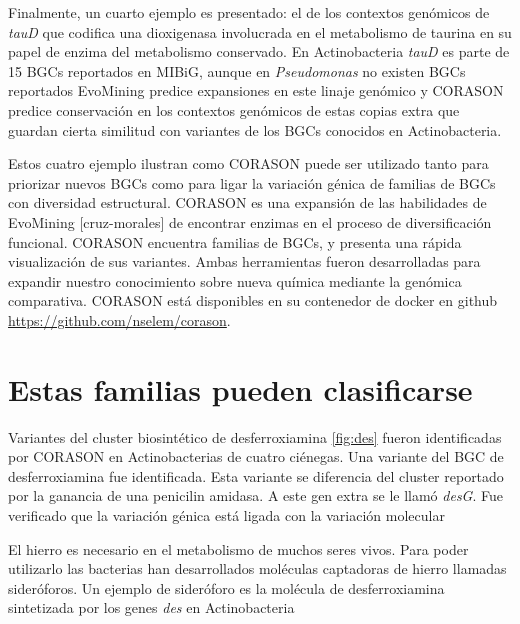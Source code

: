 \documentclass[12pt,twoside]{reedthesis}
\begin{document}
  Finalmente, un cuarto ejemplo es presentado: el de los contextos
  genómicos de \emph{tauD} que codifica una dioxigenasa involucrada en el
  metabolismo de taurina en su papel de enzima del metabolismo conservado.
  En Actinobacteria \emph{tauD} es parte de 15 BGCs reportados en MIBiG,
  aunque en \emph{Pseudomonas} no existen BGCs reportados EvoMining
  predice expansiones en este linaje genómico y CORASON predice
  conservación en los contextos genómicos de estas copias extra que
  guardan cierta similitud con variantes de los BGCs conocidos en
  Actinobacteria.
  
  Estos cuatro ejemplo ilustran como CORASON puede ser utilizado tanto
  para priorizar nuevos BGCs como para ligar la variación génica de
  familias de BGCs con diversidad estructural. CORASON es una expansión de
  las habilidades de EvoMining {[}cruz-morales{]} de encontrar enzimas en
  el proceso de diversificación funcional. CORASON encuentra familias de
  BGCs, y presenta una rápida visualización de sus variantes. Ambas
  herramientas fueron desarrolladas para expandir nuestro conocimiento
  sobre nueva química mediante la genómica comparativa. CORASON está
  disponibles en su contenedor de docker en github
  \url{https://github.com/nselem/corason}.
  
  \section{Estas familias pueden
  clasificarse}\label{estas-familias-pueden-clasificarse}
  
  Variantes del cluster biosintético de desferroxiamina \autoref{fig:des}
  fueron identificadas por CORASON en Actinobacterias de cuatro ciénegas.
  Una variante del BGC de desferroxiamina fue identificada. Esta variante
  se diferencia del cluster reportado por la ganancia de una penicilin
  amidasa. A este gen extra se le llamó \emph{desG}. Fue verificado que la
  variación génica está ligada con la variación molecular
  
  El hierro es necesario en el metabolismo de muchos seres vivos. Para
  poder utilizarlo las bacterias han desarrollados moléculas captadoras de
  hierro llamadas sideróforos. Un ejemplo de sideróforo es la molécula de
  desferroxiamina sintetizada por los genes \emph{des} en Actinobacteria
  
\end{document}
